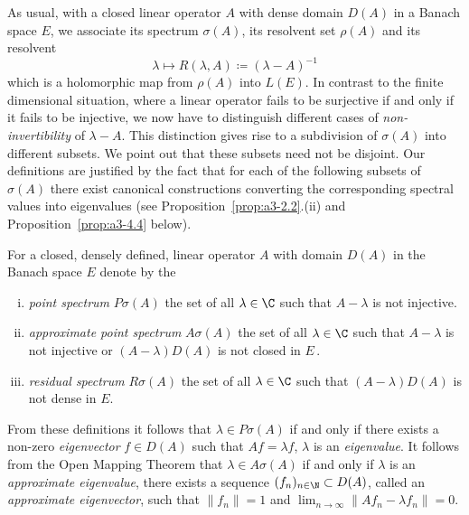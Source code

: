 As usual, with a closed linear operator $A$ with dense domain $D(A)$ in a Banach space $E$, we associate its spectrum $\sigma(A)$, its resolvent set $\rho(A)$ and its resolvent
\[
    \lambda \mapsto R(\lambda,A) \coloneqq (\lambda - A)^{-1}
\]
which is a holomorphic map from $\rho(A)$ into $L(E)$.
In contrast to the finite dimensional situation, where a linear operator fails to be surjective if and only if it fails to be injective, we now have to distinguish different cases of \emph{non-invertibility} of $\lambda - A$.
This distinction gives rise to a subdivision of $\sigma(A)$ into different subsets.
We point out that these subsets need not be disjoint. Our definitions are
justified by the fact that for each of the following subsets of $\sigma(A)$ there exist canonical constructions converting the corresponding spectral values into eigenvalues (see Proposition~\ref{prop:a3-2.2}.(ii) and Proposition~\ref{prop:a3-4.4} below).
\begin{definition}\label{def:a3-2.1}
For a closed, densely defined, linear operator $A$ with domain $D(A)$ in the Banach space $E$ denote by the
\begin{enumerate}[(i)]
\item 
\emph{point spectrum} $P\sigma(A)$ the set of all $\lambda \in \C$ such that 
$A - \lambda$ is not injective.

\item 
\emph{approximate point spectrum} $A\sigma(A)$ the set of all $\lambda \in \C$ such that $A - \lambda$ is not injective or $(A - \lambda)D(A)$ is not closed in $E$\,.

\item 
\emph{residual spectrum} $R\sigma(A)$ the set of all $\lambda \in \C$ such that $(A - \lambda)D(A)$ is not dense in $E$.
\end{enumerate}
\end{definition}
From these definitions it follows that $\lambda \in P\sigma(A)$ if and only if there exists a non-zero \emph{eigenvector} $f \in D(A)$ such that $Af = \lambda f$, \ie $\lambda$ is an \emph{eigenvalue}.
It follows from the Open Mapping Theorem that $\lambda \in A\sigma(A)$ if and only if $\lambda$ is an \emph{approximate eigenvalue}, \ie there exists a sequence $(f_{n})_{n \in \N} \subset D(A)$, called an\emph{ approximate eigenvector}, such that $\|f_{n}\| = 1$ and $ \lim_{n \to \infty} \|Af_{n} - \lambda f_{n}\| = 0$.


